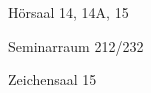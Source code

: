 \documentclass[a4paper]{article}
\begin{document}
\printHeaderLC
\begin{center}

\begin{vsltext}{1.6cm}{2cm}

    \vspace{1.5cm}
    
    Hörsaal 14, 14A, 15\\
    
    \vspace{1cm}
    
    Seminarraum 212/232\\

    \vspace{1cm}
    
    Zeichensaal 15\\
\end{vsltext}

\end{center}
\end{document}
